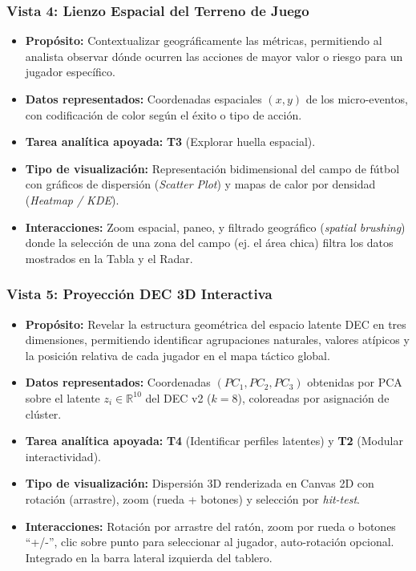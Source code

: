 \documentclass[conference]{IEEEtran}
\begin{document}
\subsubsection{Vista 4: Lienzo Espacial del Terreno de Juego}
\begin{itemize}
    \item \textbf{Propósito:} Contextualizar geográficamente las métricas, permitiendo al analista observar dónde ocurren las acciones de mayor valor o riesgo para un jugador específico.
    \item \textbf{Datos representados:} Coordenadas espaciales $(x, y)$ de los micro-eventos, con codificación de color según el éxito o tipo de acción.
    \item \textbf{Tarea analítica apoyada:} \textbf{T3} (Explorar huella espacial).
    \item \textbf{Tipo de visualización:} Representación bidimensional del campo de fútbol con gráficos de dispersión (\textit{Scatter Plot}) y mapas de calor por densidad (\textit{Heatmap / KDE}).
    \item \textbf{Interacciones:} Zoom espacial, paneo, y filtrado geográfico (\textit{spatial brushing}) donde la selección de una zona del campo (ej. el área chica) filtra los datos mostrados en la Tabla y el Radar.
\end{itemize}

\subsubsection{Vista 5: Proyección DEC 3D Interactiva}
\begin{itemize}
    \item \textbf{Propósito:} Revelar la estructura geométrica del espacio latente DEC en tres dimensiones, permitiendo identificar agrupaciones naturales, valores atípicos y la posición relativa de cada jugador en el mapa táctico global.
    \item \textbf{Datos representados:} Coordenadas $(PC_1, PC_2, PC_3)$ obtenidas por PCA sobre el latente $z_i \in \mathbb{R}^{10}$ del DEC v2 ($k=8$), coloreadas por asignación de clúster.
    \item \textbf{Tarea analítica apoyada:} \textbf{T4} (Identificar perfiles latentes) y \textbf{T2} (Modular interactividad).
    \item \textbf{Tipo de visualización:} Dispersión 3D renderizada en Canvas 2D con rotación (arrastre), zoom (rueda + botones) y selección por \textit{hit-test}.
    \item \textbf{Interacciones:} Rotación por arrastre del ratón, zoom por rueda o botones ``+/-'', clic sobre punto para seleccionar al jugador, auto-rotación opcional. Integrado en la barra lateral izquierda del tablero.
\end{itemize}
\end{document}
